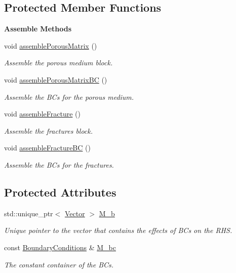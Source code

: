 \subsection*{Protected Member Functions}
\begin{Indent}{\bf Assemble Methods}\par
\begin{DoxyCompactItemize}
\item 
void \hyperlink{classFVCode3D_1_1StiffMatrix_a94c6757030321f8f557a6625e1bc2706}{assemble\+Porous\+Matrix} ()
\begin{DoxyCompactList}\small\item\em Assemble the porous medium block. \end{DoxyCompactList}\item 
void \hyperlink{classFVCode3D_1_1StiffMatrix_aee24f1b77e66c0bb7be4efbf43671c44}{assemble\+Porous\+Matrix\+BC} ()
\begin{DoxyCompactList}\small\item\em Assemble the B\+Cs for the porous medium. \end{DoxyCompactList}\item 
void \hyperlink{classFVCode3D_1_1StiffMatrix_a14fa2721385e2cc9c0c179c2cff6e618}{assemble\+Fracture} ()
\begin{DoxyCompactList}\small\item\em Assemble the fractures block. \end{DoxyCompactList}\item 
void \hyperlink{classFVCode3D_1_1StiffMatrix_af7e80d2641fc41174eb4cb56e2f119d4}{assemble\+Fracture\+BC} ()
\begin{DoxyCompactList}\small\item\em Assemble the B\+Cs for the fractures. \end{DoxyCompactList}\end{DoxyCompactItemize}
\end{Indent}
\subsection*{Protected Attributes}
\begin{DoxyCompactItemize}
\item 
std\+::unique\+\_\+ptr$<$ \hyperlink{namespaceFVCode3D_a16ccf345652402bccd1a5d2e6782526c}{Vector} $>$ \hyperlink{classFVCode3D_1_1StiffMatrix_a5bbfb34d8ef115d2806d5ded5ff109d0}{M\+\_\+b}
\begin{DoxyCompactList}\small\item\em Unique pointer to the vector that contains the effects of B\+Cs on the R\+HS. \end{DoxyCompactList}\item 
const \hyperlink{classFVCode3D_1_1BoundaryConditions}{Boundary\+Conditions} \& \hyperlink{classFVCode3D_1_1StiffMatrix_a23e3ffc97fcf112958e9966cac41e9d3}{M\+\_\+bc}
\begin{DoxyCompactList}\small\item\em The constant container of the B\+Cs. \end{DoxyCompactList}\end{DoxyCompactItemize}
